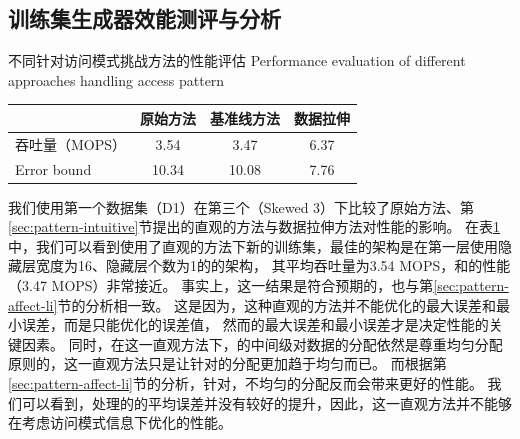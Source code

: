
\subsection{训练集生成器效能测评与分析}

\begin{table}[!hpb]
  \centering
  \bicaption[不同针对访问模式挑战方法的性能评估]
    {不同针对访问模式挑战方法的性能评估}
    {Performance evaluation of different approaches handling access pattern}
  \label{tab:pattern-sol}
  \begin{tabular}{lccc}
  \toprule
                & 原始方法  & 基准线方法  & 数据拉伸  \\ \midrule
  吞吐量（MOPS）        & 3.54    & 3.47     & 6.37    \\
  Error bound  & 10.34     & 10.08     & 7.76     \\ \bottomrule
  \end{tabular}
\end{table}

我们使用第一个数据集（D1）在第三个{\skewwl}（Skewed 3）下比较了原始方法、第\ref{sec:pattern-intuitive}节提出的直观的方法与数据拉伸方法对{\li}性能的影响。
在表\ref{tab:pattern-sol}中，我们可以看到使用了直观的方法下新的训练集，最佳的{\rmi}架构是在第一层使用隐藏层宽度为16、隐藏层个数为1的{\nn}的{\rmi}架构，
其平均吞吐量为3.54 MOPS，和{\li}的性能（3.47 MOPS）非常接近。
事实上，这一结果是符合预期的，也与第\ref{sec:pattern-affect-li}节的分析相一致。
这是因为，这种直观的方法并不能优化{\model}的最大误差和最小误差，而是只能优化{\hotkey}的误差值，
然而{\model}的最大误差和最小误差才是决定{\li}性能的关键因素。
同时，在这一直观方法下，{\rmi}的中间级对数据的分配依然是尊重均匀分配原则的，这一直观方法只是让针对{\hotkey}的分配更加趋于均匀而已。
而根据第\ref{sec:pattern-affect-li}节的分析，针对{\hotkey}，不均匀的分配反而会带来更好的性能。
我们可以看到，处理{\hotkey}的{\model}的平均误差并没有较好的提升，因此，这一直观方法并不能够在考虑访问模式信息下优化{\li}的性能。

